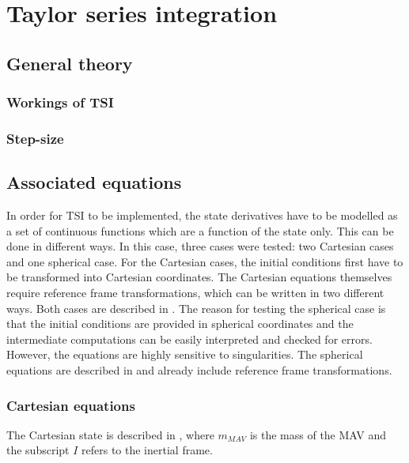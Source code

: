 \chapter{Taylor series integration} %
\label{ch:tsi}

\section{General theory}
\label{sec:genTsiTheory}

\subsection{Workings of \ac{TSI}}
\label{subsec:workTsi}

\subsection{Step-size}
\label{subsec:stepSizeTsi}

\section{Associated equations}
\label{sec:assEq}
In order for \ac{TSI} to be implemented, the state derivatives have to be modelled as a set of continuous functions which are a function of the state only. This can be done in different ways. In this case, three cases were tested: two Cartesian cases and one spherical case. For the Cartesian cases, the initial conditions first have to be transformed into Cartesian coordinates. The Cartesian equations themselves require reference frame transformations, which can be written in two different ways. Both cases are described in . The reason for testing the spherical case is that the initial conditions are provided in spherical coordinates and the intermediate computations can be easily interpreted and checked for errors. However, the equations are highly sensitive to singularities. The spherical equations are described in  and already include reference frame transformations. 

\subsection{Cartesian equations}
\label{subsec:careq}
The Cartesian state is described in , where $m_{MAV}$ is the mass of the \ac{MAV} and the subscript $I$ refers to the inertial frame.

